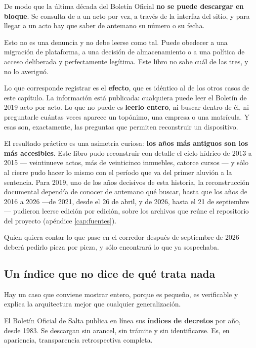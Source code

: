 \begin{cautela}
De modo que la última década del Boletín Oficial \textbf{no se puede descargar en bloque}. Se consulta de a un acto por vez, a través de la interfaz del sitio, y para llegar a un acto hay que saber de antemano su número o su fecha.

Esto no es una denuncia y no debe leerse como tal. Puede obedecer a una migración de plataforma, a una decisión de almacenamiento o a una política de acceso deliberada y perfectamente legítima. Este libro no sabe cuál de las tres, y no lo averiguó.

Lo que corresponde registrar es el \textbf{efecto}, que es idéntico al de los otros casos de este capítulo. La información está publicada: cualquiera puede leer el Boletín de 2019 acto por acto. Lo que no puede es \textbf{leerlo entero}, ni buscar dentro de él, ni preguntarle cuántas veces aparece un topónimo, una empresa o una matrícula. Y esas son, exactamente, las preguntas que permiten reconstruir un dispositivo.

El resultado práctico es una asimetría curiosa: \textbf{los años más antiguos son los más accesibles}. Este libro pudo reconstruir con detalle el ciclo hídrico de 2013 a 2015 --- veintinueve actos, más de veinticinco inmuebles, catorce cursos --- y sólo al cierre pudo hacer lo mismo con el período que va del primer aluvión a la sentencia. Para 2019, uno de los años decisivos de esta historia, la reconstrucción documental dependía de conocer de antemano qué buscar, hasta que los años de 2016 a 2026 ---de 2021, desde el 26 de abril, y de 2026, hasta el 21 de septiembre--- pudieron leerse edición por edición, sobre los archivos que reúne el repositorio del proyecto (apéndice \ref{cap:fuentes}).

Quien quiera contar lo que pase en el corredor después de septiembre de 2026 deberá pedirlo pieza por pieza, y sólo encontrará lo que ya sospechaba.
\end{cautela}

\subsection*{Un índice que no dice de qué trata nada}

Hay un caso que conviene mostrar entero, porque es pequeño, es verificable y explica la arquitectura mejor que cualquier generalización.

El Boletín Oficial de Salta publica en línea sus \textbf{índices de decretos} por año, desde 1983. Se descargan sin arancel, sin trámite y sin identificarse. Es, en apariencia, transparencia retrospectiva completa.

